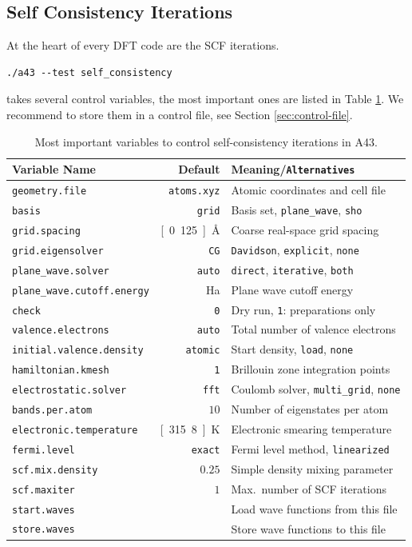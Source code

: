 \documentclass[oribibl]{llncs}
\newcommand{\ttt}[1]{\texttt{#1}}
\newcommand{\codename}{A43}
\begin{document}
\subsection{Self Consistency Iterations} \label{sec:self-consistency}
%
At the heart of every \ac{DFT} code are the \ac{SCF} iterations.
\begin{verbatim}
./a43 --test self_consistency
\end{verbatim}
takes several control variables, the most important ones are listed in Table \ref{tab:main-scf-variables}.
We recommend to store them in a control file, see Section \ref{sec:control-file}.
%
\begin{table}[h]
\caption[Main Variables]{
Most important variables to control self-consistency iterations in \codename{}.
} \label{tab:main-scf-variables}
\centering
\begin{tabular}{|l|r|l|}
\hline
  Variable Name & Default & Meaning/\ttt{Alternatives} \\
\hline
  \ttt{geometry.file} & \ttt{atoms.xyz}   & Atomic coordinates and cell file \\
  \ttt{basis}         & \ttt{grid}        & Basis set, \ttt{plane\_wave}, \ttt{sho} \\ 
  \ttt{grid.spacing}  & \unit[0.125]{\AA} & Coarse real-space grid spacing \\
  \ttt{grid.eigensolver} & \ttt{CG}       & \ttt{Davidson}, \ttt{explicit}, \ttt{none} \\
  \ttt{plane\_wave.solver} & \ttt{auto}   & \ttt{direct}, \ttt{iterative}, \ttt{both} \\ 
  \ttt{plane\_wave.cutoff.energy} & \unit[11]{Ha} & Plane wave cutoff energy \\
  \ttt{check}         & \ttt{0}           & Dry run, \ttt{1}: preparations only \\
  \ttt{valence.electrons} & \ttt{auto}    & Total number of valence electrons \\
  \ttt{initial.valence.density} & \ttt{atomic} & Start density, \ttt{load}, \ttt{none} \\
  \ttt{hamiltonian.kmesh} & \ttt{1}       & Brillouin zone integration points \\
  \ttt{electrostatic.solver} & \ttt{fft}  & Coulomb solver, \ttt{multi\_grid}, \ttt{none} \\
  \ttt{bands.per.atom} & $10$ 			  & Number of eigenstates per atom \\
  \ttt{electronic.temperature} & \unit[315.8]{K} & Electronic smearing temperature \\
  \ttt{fermi.level}   & \ttt{exact}       & Fermi level method, \ttt{linearized} \\
  \ttt{scf.mix.density} & $0.25$          & Simple density mixing parameter \\
  \ttt{scf.maxiter}   & $1$               & Max.~number of \ac{SCF} iterations \\
  \ttt{start.waves}   &                   & Load wave functions from this file \\
  \ttt{store.waves}   &                   & Store wave functions to this file \\
\hline
\end{tabular}
\end{table}
\end{document}
